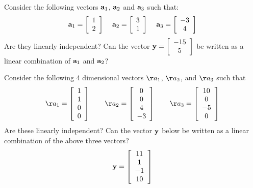 \begin{problem}
\label{2009_a5_1}
Consider the following vectors ${\bf a}_1$, ${\bf a}_2$ and ${\bf a}_3$ such that:
\[{\bf a}_1 = \left[\begin{array}{c}
1\\
2
\end{array}\right]\hspace{4mm}{\bf a}_2 = \left[\begin{array}{c}
3\\
1
\end{array}\right]\hspace{4mm}{\bf a}_3 = \left[\begin{array}{c}
-3\\
4
\end{array}\right]\]
Are they linearly independent? Can the vector ${\bf y}=\left[\begin{array}{c} -15\\ 5\end{array}\right]$ be written as a linear combination of ${\bf a}_1$ and ${\bf a}_2$?
\end{problem}

\begin{problem}
\label{2009_a5_2}
Consider the following 4 dimensional vectors $\aa_1$, $\aa_2$, and $\aa_3$ such that
$$
\aa_1 = \left[\begin{array}{c} 1\\1\\0\\0 \end{array}\right] \qquad
\aa_2 = \left[\begin{array}{c} 0\\0\\4\\-3 \end{array}\right] \qquad
\aa_3 = \left[\begin{array}{c} 10\\0\\-5\\0 \end{array}\right]
$$
Are these linearly independent? Can the vector ${\bf y}$ below be written as a 
linear combination of the above three vectors?
$$
{\bf y} = \left[\begin{array}{c} 11\\1\\-1\\10 \end{array}\right]
$$

\end{problem}

